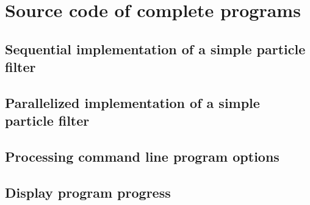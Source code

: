 \appendix

\chapter{Source code of complete programs}
\label{chap:Source code of complete programs}

\section{Sequential implementation of a simple particle filter}
\label{sec:Sequential implementation of a simple particle filter}

\section{Parallelized implementation of a simple particle filter}
\label{sec:Parallelized implementation of a simple particle filter}

\section{Processing command line program options}
\label{sec:Processing command line program options}

\section{Display program progress}
\label{sec:Display program progress}
